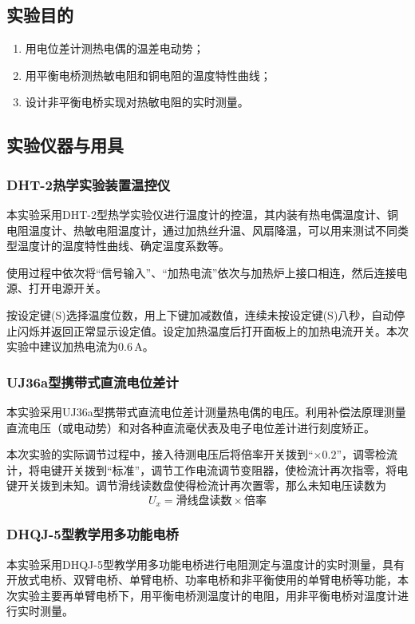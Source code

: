 \documentclass[UTF8]{article}
\theoremstyle{MyLineTheoremStyle} %
\theoremstyle{MyBlockTheoremStyle} %
\theoremstyle{MySubsubsectionStyle} %
\begin{document}
\subsection{实验目的}
\begin{enumerate}
\item 用电位差计测热电偶的温差电动势；
\item 用平衡电桥测热敏电阻和铜电阻的温度特性曲线；
\item 设计非平衡电桥实现对热敏电阻的实时测量。
\end{enumerate}


\subsection{实验仪器与用具}
\subsubsection{DHT-2热学实验装置温控仪}
本实验采用DHT-2型热学实验仪进行温度计的控温，其内装有热电偶温度计、铜电阻温度计、热敏电阻温度计，通过加热丝升温、风扇降温，可以用来测试不同类型温度计的温度特性曲线、确定温度系数等。

使用过程中依次将“信号输入”、“加热电流”依次与加热炉上接口相连，然后连接电源、打开电源开关。

按设定键(S)选择温度位数，用上下键加减数值，连续未按设定键(S)八秒，自动停止闪烁并返回正常显示设定值。设定加热温度后打开面板上的加热电流开关。本次实验中建议加热电流为$ 0.6\,\mathrm A $。
\subsubsection{UJ36a型携带式直流电位差计}
本实验采用UJ36a型携带式直流电位差计测量热电偶的电压。利用补偿法原理测量直流电压（或电动势）和对各种直流毫伏表及电子电位差计进行刻度矫正。

本次实验的实际调节过程中，接入待测电压后将倍率开关拨到“$ \times 0.2 $”，调零检流计，将电键开关拨到“标准”，调节工作电流调节变阻器，使检流计再次指零，将电键开关拨到未知。调节滑线读数盘使得检流计再次置零，那么未知电压读数为
\begin{equation}
U_x=\text{滑线盘读数}\times\text{倍率}
\end{equation}
\subsubsection{DHQJ-5型教学用多功能电桥}
本实验采用DHQJ-5型教学用多功能电桥进行电阻测定与温度计的实时测量，具有开放式电桥、双臂电桥、单臂电桥、功率电桥和非平衡使用的单臂电桥等功能，本次实验主要再单臂电桥下，用平衡电桥测温度计的电阻，用非平衡电桥对温度计进行实时测量。
\end{document}
